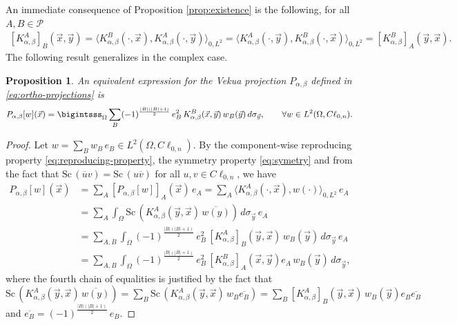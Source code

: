 \documentclass[12pt]{article}
\newtheorem{proposition}[theorem]{Proposition}
\def\Sc{\mbox{Sc}\,}
\begin{document}
An immediate consequence of Proposition \ref{prop:existence} is the following, for all $A,B\in \mathcal{P}$
\begin{align}\label{eq:symetry}
[K_{\alpha,\beta}^A]_B(\vec x,\vec y)=\langle K_{\alpha,\beta}^B(\cdot, \vec x), K_{\alpha,\beta}^A(\cdot,\vec y) \rangle_{0,L^2}=\langle  K_{\alpha,\beta}^A(\cdot,\vec y), K_{\alpha,\beta}^B(\cdot, \vec x) \rangle_{0,L^2}=[K_{\alpha,\beta}^B]_A(\vec y,\vec x).
\end{align}	
The following result generalizes \cite[Prop.\ 14]{Campos2020} in the complex case.
\begin{proposition}\label{prop:projector}
An equivalent expression for the Vekua projection $P_{\alpha,\beta}$ defined in \eqref{eq:ortho-projections} is
\begin{equation*}%
P_{\alpha,\beta}[w](\vec x)=\bigintsss_{\Omega} \sum_B (-1)^{\frac{|B|(|B|+1)}{2}}\, e_B^2\,  K^B_{\alpha,\beta}(\vec x,\vec y) \, w_B(\vec y) \,d\sigma_{\vec y}, \qquad \forall w\in L^2(\Omega,C\ell_{0,n}). 
\end{equation*}
\end{proposition}
\begin{proof}
Let $w=\sum_{B}w_B\, e_B\in L^2(\Omega,C\ell_{0,n})$. By the component-wise reproducing property \eqref{eq:reproducing-property}, the symmetry property \eqref{eq:symetry} and from the fact that $\Sc(\overline{u}v)=\Sc(u\overline{v})$ for all $u,v\in C\ell_{0,n}$, we have
\begin{align*}
  P_{\alpha,\beta}[w](\vec x)&=\sum_A [P_{\alpha,\beta}[w]]_A(\vec x)\, e_A
  =\sum_A \langle K_{\alpha,\beta}^A(\cdot, \vec x), w(\cdot) \rangle_{0,L^2}\, e_A\\
  &=\sum_A \int_{\Omega} \Sc\left( K_{\alpha,\beta}^A (\vec  y,\vec x)\, \overline{w(y)}\right)\, d\sigma_{\vec y}\, e_A\\
  &=\sum_{A,B} \int_{\Omega} (-1)^{\frac{|B|(|B|+1)}{2}}\, e_B^2\,[K_{\alpha,\beta}^A]_B(\vec y, \vec x)\, w_B(\vec y)\,d\sigma_{\vec y}\, e_A\\
  &=\sum_{A,B} \int_{\Omega} (-1)^{\frac{|B|(|B|+1)}{2}}\, e_B^2\,[K_{\alpha,\beta}^B]_A(\vec x, \vec y)e_A\, w_B(\vec y)\, d\sigma_{\vec y},
\end{align*}
where the fourth chain of equalities is justified by the fact that $\Sc\left( K_{\alpha,\beta}^A (\vec y,\vec x)\, \overline{w(y)}\right)=\sum_B \Sc\left( K_{\alpha,\beta}^A (\vec  y,\vec x)\, w_B\overline{e_B}\right)=\sum_B [K_{\alpha,\beta}^A]_B(\vec y, \vec x)\, w_B(\vec y) e_B\overline{e_B}$ and $\overline{e_B}=(-1)^{\frac{|B|(|B|+1)}{2}}\, e_B$.
\end{proof}
\end{document}
